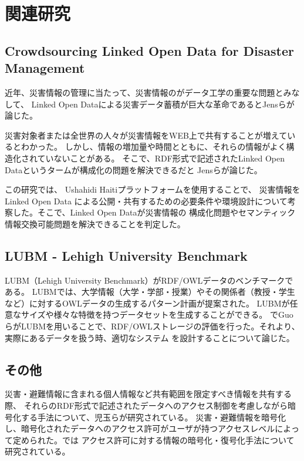 ﻿%
\chapter{関連研究}

\section{Crowdsourcing Linked Open Data for Disaster Management}

近年、災害情報の管理に当たって、災害情報のがデータ工学の重要な問題とみなして、
Linked Open Dataによる災害データ蓄積が巨大な革命であるとJensら\cite{cite:opendata}が論じた。

災害対象者または全世界の人々が災害情報をWEB上で共有することが増えているとわかった。
しかし、情報の増加量や時間とともに、それらの情報がよく構造化されていないことがある。
そこで、RDF形式で記述されたLinked Open Dataというタームが構成化の問題を解決できるだと
Jensら\cite{cite:opendata}が論じた。 

この研究では、 Ushahidi Haitiプラットフォームを使用することで、 災害情報をLinked Open Data
による公開・共有するための必要条件や環境設計について考察した。そこで、Linked Open Dataが災害情報の
構成化問題やセマンティック情報交換可能問題を解決できることを判定した。

\section{LUBM - Lehigh University Benchmark}

LUBM（Lehigh University Benchmark）がRDF/OWLデータのベンチマークである。
LUBMでは、大学情報（大学・学部・授業）やその関係者（教授・学生など）に対するOWLデータの生成するパターン計画が提案された。
LUBMが任意なサイズや様々な特徴を持つデータセットを生成することができる。
\cite{cite:lubm}でGuoらがLUBMを用いることで、RDF/OWLストレージの評価を行った。それより、実際にあるデータを扱う時、適切なシステム
を設計することについて論じた。

\section{その他}

災害・避難情報に含まれる個人情報など共有範囲を限定すべき情報を共有する際、
それらのRDF形式で記述されたデータへのアクセス制御を考慮しながら暗号化する手法について、児玉らが研究されている\cite{cite:kodama}。
災害・避難情報を暗号化し、暗号化されたデータへのアクセス許可がユーザが持つアクセスレベルによって定められた。\cite{cite:kodama}では
アクセス許可に対する情報の暗号化・復号化手法について研究されている。


